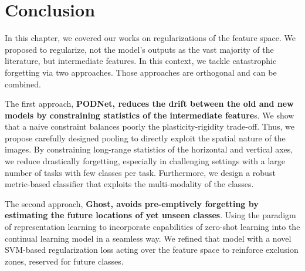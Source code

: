 \section{Conclusion}

In this chapter, we covered our works on regularizations of the feature space. We proposed to
regularize, not the model's outputs as the vast majority of the literature, but intermediate
features. In this context, we tackle catastrophic forgetting via two approaches. Those approaches
are orthogonal and can be combined.

The first approach, \textbf{PODNet, reduces the drift between the old and new models by constraining
    statistics of the intermediate feature}s. We show that a naive constraint balances poorly the
plasticity-rigidity trade-off. Thus, we propose carefully designed pooling to directly exploit the
spatial nature of the images. By constraining long-range statistics of the horizontal and vertical
axes, we reduce drastically forgetting, especially in challenging settings with a large number of
tasks with few classes per task. Furthermore, we design a robust metric-based classifier that
exploits the multi-modality of the classes.

The second approach, \textbf{Ghost, avoids pre-emptively forgetting by estimating the future
    locations of yet unseen classes}. Using the paradigm of representation learning to incorporate
capabilities of zero-shot learning into the continual learning model in a seamless way. We refined
that model with a novel SVM-based regularization loss acting over the feature space to reinforce
exclusion zones, reserved for future classes.
